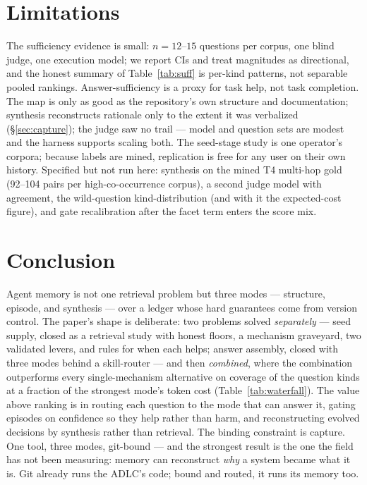 \documentclass[twocolumn,10pt]{article}
\begin{document}
\section{Limitations}\label{sec:limits}

The sufficiency evidence is small: $n{=}12$--$15$ questions per corpus, one blind judge, one execution model; we report CIs and treat magnitudes as directional, and the honest summary of Table~\ref{tab:suff} is per-kind patterns, not separable pooled rankings. Answer-sufficiency is a proxy for task help, not task completion. The map is only as good as the repository's own structure and documentation; synthesis reconstructs rationale only to the extent it was verbalized (\S\ref{sec:capture}); the judge saw no trail --- model and question sets are modest and the harness supports scaling both. The seed-stage study is one operator's corpora; because labels are mined, replication is free for any user on their own history. Specified but not run here: synthesis on the mined T4 multi-hop gold (92--104 pairs per high-co-occurrence corpus), a second judge model with agreement, the wild-question kind-distribution (and with it the expected-cost figure), and gate recalibration after the facet term enters the score mix.

\section{Conclusion}\label{sec:conclusion}

Agent memory is not one retrieval problem but three modes --- structure, episode, and synthesis --- over a ledger whose hard guarantees come from version control. The paper's shape is deliberate: two problems solved \emph{separately} --- seed supply, closed as a retrieval study with honest floors, a mechanism graveyard, two validated levers, and rules for when each helps; answer assembly, closed with three modes behind a skill-router --- and then \emph{combined}, where the combination outperforms every single-mechanism alternative on coverage of the question kinds at a fraction of the strongest mode's token cost (Table~\ref{tab:waterfall}). The value above ranking is in routing each question to the mode that can answer it, gating episodes on confidence so they help rather than harm, and reconstructing evolved decisions by synthesis rather than retrieval. The binding constraint is capture. One tool, three modes, git-bound --- and the strongest result is the one the field has not been measuring: memory can reconstruct \emph{why} a system became what it is. Git already runs the ADLC's code; bound and routed, it runs its memory too.
\end{document}
